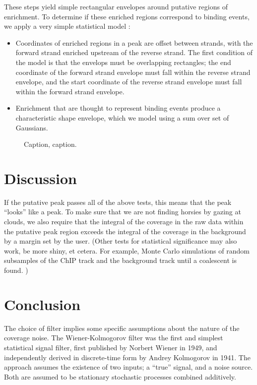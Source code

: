 \documentclass{bioinfo}
\begin{document}
{\begin{methods}
\begin{itemize}

\end{itemize}

These steps yield simple rectangular envelopes around putative regions
of enrichment. To determine if these enriched regions correspond to
binding events, we apply a very simple statistical model :

\begin{itemize}

\item Coordinates of enriched regions in a peak are offset between
  strands, with the forward strand enriched upstream of the reverse
  strand. The first condition of the model is that the envelops must
  be overlapping rectangles; the end coordinate of the forward strand
  envelope must fall within the reverse strand envelope, and the
  start coordinate of the reverse strand envelope must fall within the
  forward strand envelope. 

\item Enrichment that are thought to represent binding events produce
  a characteristic shape envelope, which we model using a sum over set
  of Gaussians.

\end{itemize}

\end{methods}

\begin{figure}[!tpb]%
\caption{Caption, caption.}\label{fig:01}
\end{figure}

\section{Discussion}

If the putative peak passes all of the above tests, this means that
the peak ``looks'' like a peak. To make sure that we are not finding
horsies by gazing at clouds, we also require that the integral of the
coverage in the raw data within the putative peak region exceeds the
integral of the coverage in the background by a margin set by the
user. (Other tests for statistical significance may also work, be more
shiny, et cetera. For example, Monte Carlo simulations of random
subsamples of the ChIP track and the background track until a
coalescent is found. )


\section{Conclusion}
The choice of filter implies some specific assumptions about the
nature of the coverage noise. The Wiener-Kolmogorov filter was the
first and simplest statistical signal filter, first published by
Norbert Wiener in 1949, and independently derived in discrete-time
form by Andrey Kolmogorov in 1941. The approach assumes the existence
of two inputs; a ``true'' signal, and a noise source. Both are assumed
to be stationary stochastic processes combined additively. 

}
\end{document}
